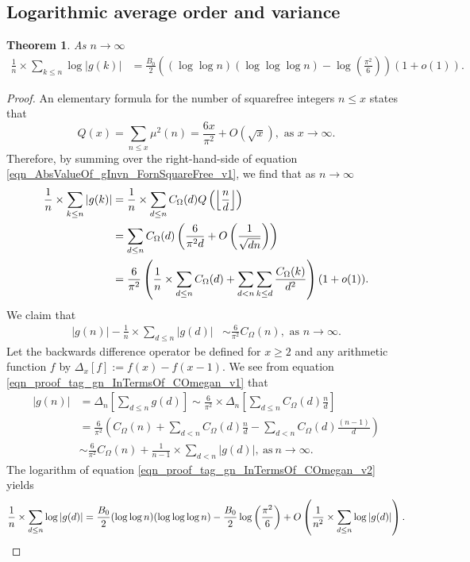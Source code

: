 \documentclass[11pt,reqno,a4letter]{article}
\numberwithin{equation}{section}
\numberwithin{figure}{section}
\numberwithin{table}{section}
\newcommand{\seqnum}[1]{\href{http://oeis.org/#1}{\color{ProcessBlue}{\underline{#1}}}}
\newcommand{\Floor}[2]{\ensuremath{\left\lfloor \frac{#1}{#2} \right\rfloor}}
\theoremstyle{plain}
\newtheorem{theorem}{Theorem}
\numberwithin{theorem}{section}
\theoremstyle{definition}
\begin{document}
\subsection{Logarithmic average order and variance} 

\begin{theorem} 
\label{cor_ExpectationFormulaAbsgInvn_v2} 
As $n \rightarrow \infty$ 
\begin{align*} 
\frac{1}{n} \times \sum_{k \leq n} \log |g(k)| & = 
	\frac{B_0}{2} \left((\log\log n)(\log\log\log n) - 
	\log\left(\frac{\pi^2}{6}\right)\right)(1 + o(1)). 
\end{align*} 
\end{theorem} 
\begin{proof}
An elementary formula for the number of squarefree integers $n \leq x$ states that 
\cite[\S 18.6]{HARDYWRIGHT} \cite[\seqnum{A013928}]{OEIS} 
\[ 
Q(x) = \sum_{n \leq x} \mu^2(n) = \frac{6x}{\pi^2} + O\left(\sqrt{x}\right), 
     \text{\ as $x \rightarrow \infty$}. 
\]
Therefore, by summing over the right-hand-side of equation 
\eqref{eqn_AbsValueOf_gInvn_FornSquareFree_v1}, we find that as $n \rightarrow \infty$   
\begin{align} 
\notag 
\frac{1}{n} \times \sum_{k \leq n} |g(k)| & = \frac{1}{n} \times \sum_{d \leq n} 
     C_{\Omega}(d) Q\left(\Floor{n}{d}\right) \\ 
\notag 
     & = \sum_{d \leq n} C_{\Omega}(d) \left(\frac{6}{\pi^2 d} + O\left(\frac{1}{\sqrt{dn}}\right) 
     \right) \\ 
\label{eqn_proof_tag_gn_InTermsOf_COmegan_v1}
     & = \frac{6}{\pi^2} \left(\frac{1}{n} \times \sum_{d \leq n} C_{\Omega}(d) + \sum_{d<n} 
     \sum_{k \leq d} \frac{C_{\Omega}(k)}{d^2}\right)(1 + o(1)). 
\end{align} 
We claim that 
\begin{align}
\label{eqn_proof_tag_gn_InTermsOf_COmegan_v2}
|g(n)| - \frac{1}{n} \times \sum_{d \leq n} |g(d)| & \sim \frac{6}{\pi^2} C_{\Omega}(n), 
     \text{\ as\ } n \rightarrow \infty. 
\end{align} 
Let the backwards difference operator 
be defined for $x \geq 2$ and any arithmetic function $f$ by 
$\Delta_x[f] := f(x) - f(x-1)$. 
We see from equation \eqref{eqn_proof_tag_gn_InTermsOf_COmegan_v1} that 
\begin{align*} 
     |g(n)| & = \Delta_n\left[\sum_{d \leq n} g(d)\right]  
     \sim \frac{6}{\pi^2} \times 
     \Delta_n\left[\sum_{d \leq n} C_{\Omega}(d) \frac{n}{d}\right] \\ 
     & = \frac{6}{\pi^2}\left(C_{\Omega}(n) + \sum_{d < n} C_{\Omega}(d) \frac{n}{d} - 
     \sum_{d<n} C_{\Omega}(d) \frac{(n-1)}{d}\right) \\ 
     & \sim \frac{6}{\pi^2} C_{\Omega}(n) + \frac{1}{n-1} \times \sum_{d < n} |g(d)|, 
     \mathrm{\ as\ } n \rightarrow \infty. 
\end{align*} 
The logarithm of equation \eqref{eqn_proof_tag_gn_InTermsOf_COmegan_v2} yields
\[
\frac{1}{n} \times \sum_{d \leq n} \log |g(d)| = 
     \frac{B_0}{2} (\log\log n) (\log\log\log n) - 
     \frac{B_0}{2}\log\left(\frac{\pi^2}{6}\right) + 
     O\left(\frac{1}{n^2} \times \sum_{d \leq n} \log |g(d)|\right). 
     \qedhere
\]
\end{proof} 
\end{document}
